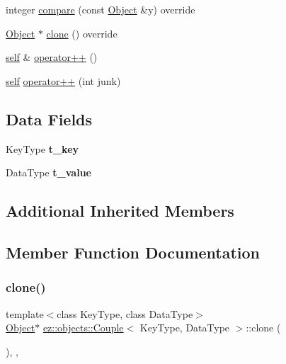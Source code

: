 \begin{DoxyCompactItemize}
integer \hyperlink{classez_1_1objects_1_1Couple_a0f4afb11f854f2e84fd2d413cd08212e}{compare} (const \hyperlink{classez_1_1objects_1_1Object}{Object} \&y) override
\item 
\hyperlink{classez_1_1objects_1_1Object}{Object} $\ast$ \hyperlink{classez_1_1objects_1_1Couple_ad258aa010ee9a4bfdecb715de7d93116}{clone} () override
\item 
\hyperlink{classez_1_1objects_1_1Couple}{self} \& \hyperlink{classez_1_1objects_1_1Couple_acd9d9661211e6623461c3c7b2bd37e42}{operator++} ()
\item 
\hyperlink{classez_1_1objects_1_1Couple}{self} \hyperlink{classez_1_1objects_1_1Couple_aae38d565e36c47a0a7fceaf6abbdf9ec}{operator++} (int junk)
\end{DoxyCompactItemize}
\subsection*{Data Fields}
\begin{DoxyCompactItemize}
\item 
\mbox{\label{classez_1_1objects_1_1Couple_a16bebe415cd876034d0d230dc00d3faf}} 
Key\+Type {\bfseries t\+\_\+key}
\item 
\mbox{\label{classez_1_1objects_1_1Couple_a76158ad38ee151c7c498c4659ef4b0f7}} 
Data\+Type {\bfseries t\+\_\+value}
\end{DoxyCompactItemize}
\subsection*{Additional Inherited Members}


\subsection{Member Function Documentation}
\mbox{\label{classez_1_1objects_1_1Couple_ad258aa010ee9a4bfdecb715de7d93116}} 
\subsubsection{\texorpdfstring{clone()}{clone()}}
{\footnotesize\ttfamily template$<$class Key\+Type, class Data\+Type$>$ \\
\hyperlink{classez_1_1objects_1_1Object}{Object}$\ast$ \hyperlink{classez_1_1objects_1_1Couple}{ez\+::objects\+::\+Couple}$<$ Key\+Type, Data\+Type $>$\+::clone (\begin{DoxyParamCaption}{ }\end{DoxyParamCaption})\hspace{0.3cm}{\ttfamily [inline]}, {\ttfamily [override]}, {\ttfamily [virtual]}}

